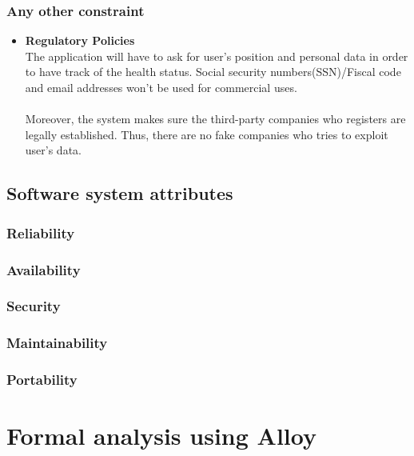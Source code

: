 \documentclass[12pt]{report}
\begin{document}
\subsection{Any other constraint}
\begin{itemize}
\item{} \textbf{Regulatory Policies}\\
The application will have to ask for user's position and personal data in order to have track of the health status. Social security numbers(SSN)/Fiscal code and email addresses won't be used for commercial uses.\\\\
Moreover, the system makes sure the third-party companies who registers are legally established. Thus, there are no fake companies who tries to exploit user's data. 
\end{itemize}
\section{Software system attributes}
\subsection{Reliability}
\subsection{Availability}
\subsection{Security}
\subsection{Maintainability}
\subsection{Portability}

\chapter{Formal analysis using Alloy}
\end{document}
